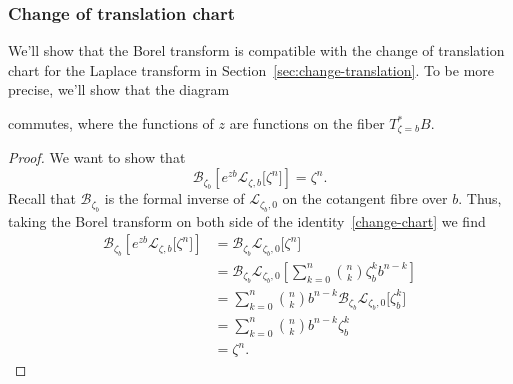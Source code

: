 \documentclass{article}
\newcommand{\C}{\mathbb{C}}
\newcommand{\laplace}{\mathcal{L}}
\newcommand{\borel}{\mathcal{B}}
\theoremstyle{definition}
\theoremstyle{plain}
\begin{document}
\subsubsection{Change of translation chart}\label{transl-borel}
We'll show that the Borel transform is compatible with the change of translation chart for the Laplace transform in Section~\ref{sec:change-translation}. To be more precise, we'll show that the diagram
\begin{center}
\end{center}
commutes, where the functions of $z$ are functions on the fiber $T^*_{\zeta=b}B$. 
\begin{proof}
We want to show that 
\[\borel_{\zeta_b}\left[e^{zb} \laplace_{\zeta,b}\big[\zeta^n\big]\right]=\zeta^n.\]
Recall that $\borel_{\zeta_b}$
is the formal inverse of $\laplace_{\zeta_b,0}$ on the cotangent fibre over $b$. Thus, taking the Borel transform on both side of the identity~\eqref{change-chart} we find
  \begin{align*}
      \borel_{\zeta_b}\left[e^{zb} \laplace_{\zeta,b}\big[\zeta^n\big]\right]&=\borel_{\zeta_b}\laplace_{\zeta_b,0}\big[\zeta^n\big]\\
      &=\borel_{\zeta_b}\laplace_{\zeta_b,0}\left[\sum_{k=0}^n{n\choose k}\zeta_b^k b^{n-k}\right]\\
      &=\sum_{k=0}^n{n\choose k} b^{n-k}\borel_{\zeta_b}\laplace_{\zeta_b,0}\big[\zeta_b^k \big]\\
      &=\sum_{k=0}^n{n\choose k} b^{n-k}\zeta_b^k\\
      &=\zeta^n.
  \end{align*}
\end{proof}
\end{document}
